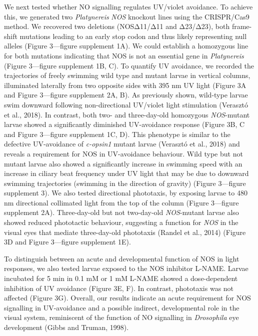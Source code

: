 \documentclass[
  10pt,
  onecolumn]{article}
\begin{document}
We next tested whether NO signalling regulates UV/violet avoidance. To
achieve this, we generated two \emph{Platynereis} \emph{NOS} knockout
lines using the CRISPR/Cas9 method. We recovered two deletions
(NOSΔ11/Δ11 and Δ23/Δ23), both frame-shift mutations leading to an early
stop codon and thus likely representing null alleles (Figure 3---figure
supplement 1A). We could establish a homozygous line for both mutations
indicating that NOS is not an essential gene in \emph{Platynereis}
(Figure 3---figure supplement 1B, C). To quantify UV avoidance, we
recorded the trajectories of freely swimming wild type and mutant larvae
in vertical columns, illuminated laterally from two opposite sides with
395 nm UV light (Figure 3A and Figure 3---figure supplement 2A, B). As
previously shown, wild-type larvae swim downward following
non-directional UV/violet light stimulation (Verasztó et al., 2018). In
contrast, both two- and three-day-old homozygous \emph{NOS}-mutant
larvae showed a significantly diminished UV-avoidance response (Figure
3B, C and Figure 3---figure supplement 1C, D). This phenotype is similar
to the defective UV-avoidance of \emph{c-opsin1} mutant larvae (Verasztó
et al., 2018) and reveals a requirement for NOS in UV-avoidance
behaviour. Wild type but not mutant larvae also showed a significantly
increase in swimming speed with an increase in ciliary beat frequency
under UV light that may be due to downward swimming trajectories
(swimming in the direction of gravity) (Figure 3---figure supplement 3).
We also tested directional phototaxis, by exposing larvae to 480 nm
directional collimated light from the top of the column (Figure
3---figure supplement 2A). Three-day-old but not two-day-old
\emph{NOS}-mutant larvae also showed reduced phototactic behaviour,
suggesting a function for \emph{NOS} in the visual eyes that mediate
three-day-old phototaxis (Randel et al., 2014) (Figure 3D and Figure
3---figure supplement 1E).

To distinguish between an acute and developmental function of NOS in
light responses, we also tested larvae exposed to the NOS inhibitor
L-NAME. Larvae incubated for 5 min in 0.1 mM or 1 mM L-NAME showed a
dose-dependent inhibition of UV avoidance (Figure 3E, F). In contrast,
phototaxis was not affected (Figure 3G). Overall, our results indicate
an acute requirement for NOS signalling in UV-avoidance and a possible
indirect, developmental role in the visual system, reminiscent of the
function of NO signalling in \emph{Drosophila} eye development (Gibbs
and Truman, 1998).
\end{document}
